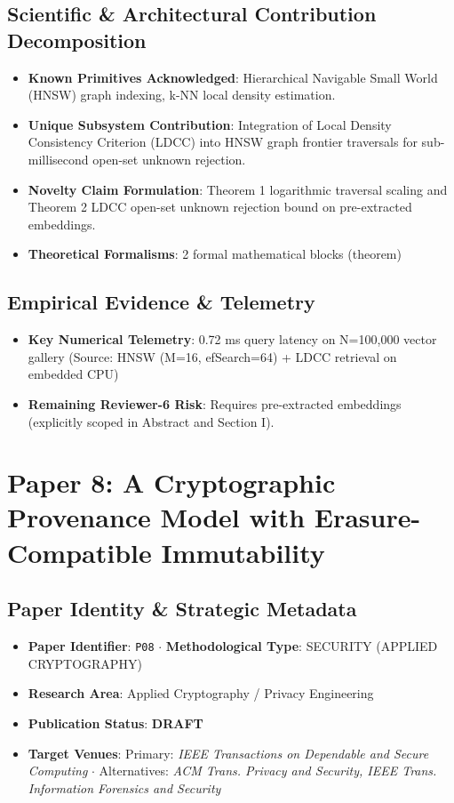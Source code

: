 \documentclass[11pt,a4paper]{article}
\begin{document}
\subsection*{Scientific & Architectural Contribution Decomposition}
\begin{itemize}[leftmargin=1.5em, itemsep=0.2em]
    \item \textbf{Known Primitives Acknowledged}: Hierarchical Navigable Small World (HNSW) graph indexing, k-NN local density estimation.
    \item \textbf{Unique Subsystem Contribution}: Integration of Local Density Consistency Criterion (LDCC) into HNSW graph frontier traversals for sub-millisecond open-set unknown rejection.
    \item \textbf{Novelty Claim Formulation}: Theorem 1 logarithmic traversal scaling and Theorem 2 LDCC open-set unknown rejection bound on pre-extracted embeddings.
    \item \textbf{Theoretical Formalisms}: 2 formal mathematical blocks (theorem)
\end{itemize}

\subsection*{Empirical Evidence & Telemetry}
\begin{itemize}[leftmargin=1.5em, itemsep=0.2em]
    \item \textbf{Key Numerical Telemetry}: 0.72 ms query latency on N=100,000 vector gallery (Source: HNSW (M=16, efSearch=64) + LDCC retrieval on embedded CPU)
    \item \textbf{Remaining Reviewer-6 Risk}: Requires pre-extracted embeddings (explicitly scoped in Abstract and Section I).
\end{itemize}

\section{Paper 8: A Cryptographic Provenance Model with Erasure-Compatible Immutability}

\subsection*{Paper Identity \& Strategic Metadata}
\begin{itemize}[leftmargin=1.5em, itemsep=0.2em]
    \item \textbf{Paper Identifier}: \texttt{P08} $\cdot$ \textbf{Methodological Type}: SECURITY (APPLIED CRYPTOGRAPHY)
    \item \textbf{Research Area}: Applied Cryptography / Privacy Engineering
    \item \textbf{Publication Status}: \textbf{DRAFT}
    \item \textbf{Target Venues}: Primary: \textit{IEEE Transactions on Dependable and Secure Computing} $\cdot$ Alternatives: \textit{ACM Trans. Privacy and Security, IEEE Trans. Information Forensics and Security}
\end{itemize}
\end{document}

